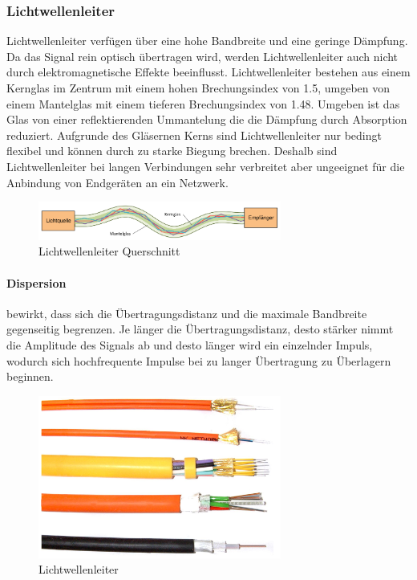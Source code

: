 \documentclass{article}
\begin{document}
\subsubsection{Lichtwellenleiter}
Lichtwellenleiter verfügen über eine hohe Bandbreite und eine geringe Dämpfung. Da das Signal rein optisch übertragen wird, werden Lichtwellenleiter auch nicht durch elektromagnetische Effekte beeinflusst. Lichtwellenleiter bestehen aus einem Kernglas im Zentrum mit einem hohen Brechungsindex von 1.5, umgeben von einem Mantelglas mit einem tieferen Brechungsindex von 1.48. Umgeben ist das Glas von einer reflektierenden Ummantelung die die Dämpfung durch Absorption reduziert. Aufgrunde des Gläsernen Kerns sind Lichtwellenleiter nur bedingt flexibel und können durch zu starke Biegung brechen. Deshalb sind Lichtwellenleiter bei langen Verbindungen sehr verbreitet aber ungeeignet für die Anbindung von Endgeräten an ein Netzwerk.
\begin{figure}[h!]
		\begin{center}
		\includegraphics[width=8cm]{img/lwl2.png}
		\end{center}
		\caption{Lichtwellenleiter Querschnitt}
		\label{fig:Lichtwellenleiter Querschnitt}
\end{figure}
\paragraph{Dispersion}
bewirkt, dass sich die Übertragungsdistanz und die maximale Bandbreite gegenseitig begrenzen. Je länger die Übertragungsdistanz, desto stärker nimmt die Amplitude des Signals ab und desto länger wird ein einzelnder Impuls, wodurch sich hochfrequente Impulse bei zu langer Übertragung zu Überlagern beginnen.
\begin{figure}[h!]
		\begin{center}
		\includegraphics[width=8cm]{img/lwl.png}
		\end{center}
		\caption{Lichtwellenleiter}
		\label{fig:Lichtwellenleiter}
\end{figure}
\end{document}
